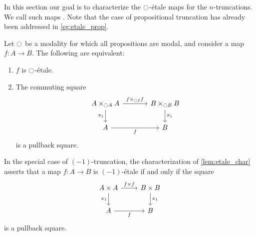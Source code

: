 \documentclass[9pt,twosided]{amsart}
\begin{document}
In this section our goal is to characterize the ${\ocircle}$-\'etale maps for the $n$-truncations. We call such maps . Note that the case of propositional truncation has already been addressed in \cref{eg:etale_prop}.

\begin{lem}\label{lem:etale_char}
Let ${\ocircle}$ be a modality for which all propositions are modal, and consider a map $f:A\to B$. The following are equivalent:
\begin{enumerate}
\item $f$ is ${\ocircle}$-\'etale.
\item The commuting square
\begin{equation*}
\begin{tikzcd}[column sep=large]
A\times_{\modal A} A \arrow[d,swap,"\pi_1"] \arrow[r,"{f\times_{\modal f} f}"] & B\times_{\modal B} B \arrow[d,"\pi_1"] \\
A \arrow[r,swap,"f"] & B
\end{tikzcd}
\end{equation*}
is a pullback square.
\end{enumerate}
\end{lem}

\begin{rmk}
In the special case of $(-1)$-truncation, the characterization of \cref{lem:etale_char} asserts that a map $f:A\to B$ is $(-1)$-\'etale if and only if the square
\begin{equation*}
\begin{tikzcd}
A\times A \arrow[d,swap,"\pi_1"] \arrow[r,"{f\times f}"] & B\times B \arrow[d,"\pi_1"] \\
A \arrow[r,swap,"f"] & B
\end{tikzcd}
\end{equation*}
is a pullback square.
\end{rmk}
\end{document}
